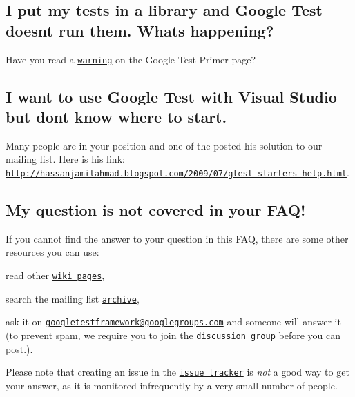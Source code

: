 \subsection*{I put my tests in a library and Google Test doesn\textquotesingle{}t run them. What\textquotesingle{}s happening?}

Have you read a \href{V1_5_Primer.md#important-note-for-visual-c-users}{\tt warning} on the Google Test Primer page?

\subsection*{I want to use Google Test with Visual Studio but don\textquotesingle{}t know where to start.}

Many people are in your position and one of the posted his solution to our mailing list. Here is his link\+: \href{http://hassanjamilahmad.blogspot.com/2009/07/gtest-starters-help.html}{\tt http\+://hassanjamilahmad.\+blogspot.\+com/2009/07/gtest-\/starters-\/help.\+html}.

\subsection*{My question is not covered in your F\+A\+Q!}

If you cannot find the answer to your question in this F\+AQ, there are some other resources you can use\+:


\begin{DoxyEnumerate}
\item read other \href{http://code.google.com/p/googletest/w/list}{\tt wiki pages},
\end{DoxyEnumerate}
\begin{DoxyEnumerate}
\item search the mailing list \href{http://groups.google.com/group/googletestframework/topics}{\tt archive},
\end{DoxyEnumerate}
\begin{DoxyEnumerate}
\item ask it on \href{mailto:googletestframework@googlegroups.com}{\tt googletestframework@googlegroups.\+com} and someone will answer it (to prevent spam, we require you to join the \href{http://groups.google.com/group/googletestframework}{\tt discussion group} before you can post.).
\end{DoxyEnumerate}

Please note that creating an issue in the \href{http://code.google.com/p/googletest/issues/list}{\tt issue tracker} is {\itshape not} a good way to get your answer, as it is monitored infrequently by a very small number of people.


